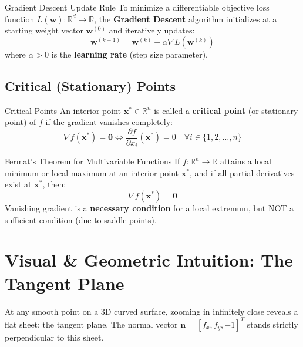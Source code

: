 \begin{definitionbox}{Gradient Descent Update Rule}
To minimize a differentiable objective loss function $L(\mathbf{w}): \mathbb{R}^d \to \mathbb{R}$, the \textbf{Gradient Descent} algorithm initializes at a starting weight vector $\mathbf{w}^{(0)}$ and iteratively updates:
\begin{equation}
\mathbf{w}^{(k+1)} = \mathbf{w}^{(k)} - \alpha \nabla L(\mathbf{w}^{(k)})
\end{equation}
where $\alpha > 0$ is the \textbf{learning rate} (step size parameter).
\end{definitionbox}

\subsection{Critical (Stationary) Points}

\begin{definitionbox}{Critical Points}
An interior point $\mathbf{x}^* \in \mathbb{R}^n$ is called a \textbf{critical point} (or stationary point) of $f$ if the gradient vanishes completely:
\begin{equation}
\nabla f(\mathbf{x}^*) = \mathbf{0} \iff \frac{\partial f}{\partial x_i}(\mathbf{x}^*) = 0 \quad \forall i \in \{1, 2, \dots, n\}
\end{equation}
\end{definitionbox}

\begin{theorembox}{Fermat's Theorem for Multivariable Functions}
If $f: \mathbb{R}^n \to \mathbb{R}$ attains a local minimum or local maximum at an interior point $\mathbf{x}^*$, and if all partial derivatives exist at $\mathbf{x}^*$, then:
\begin{equation}
\nabla f(\mathbf{x}^*) = \mathbf{0}
\end{equation}
Vanishing gradient is a \textbf{necessary condition} for a local extremum, but NOT a sufficient condition (due to saddle points).
\end{theorembox}

\section{Visual \& Geometric Intuition: The Tangent Plane}

At any smooth point on a 3D curved surface, zooming in infinitely close reveals a flat sheet: the tangent plane. The normal vector $\mathbf{n} = [f_x, f_y, -1]^T$ stands strictly perpendicular to this sheet.

